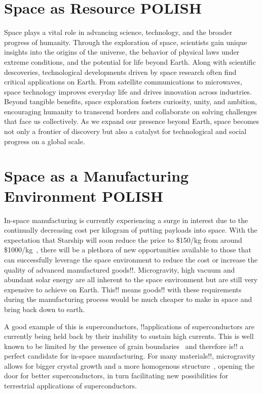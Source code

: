 \section{Space as Resource POLISH}
Space plays a vital role in advancing science, technology, and the broader progress of humanity. Through the exploration of space, scientists gain unique insights into the origins of the universe, the behavior of physical laws under extreme conditions, and the potential for life beyond Earth. Along with scientific descoveries, technological developments driven by space research often find critical applications on Earth. From satellite communications to microwaves, space technology improves everyday life and drives innovation across industries. Beyond tangible benefits, space exploration fosters curiosity, unity, and ambition, encouraging humanity to transcend borders and collaborate on solving challenges that face us collectively. As we expand our presence beyond Earth, space becomes not only a frontier of discovery but also a catalyst for technological and social progress on a global scale.

\section{Space as a Manufacturing Environment POLISH}
In-space manufacturing is currently experiencing a surge in interest due to the continually decreasing cost per kilogram of putting payloads into space. With the expectation that Starship will soon reduce the price to \$150/kg from around \$1000/kg~\cite{nextbigfuture2024spacex}, there will be a plethora of new opportunities available to those that can successfully leverage the space environment to reduce the cost or increase the quality of advanced manufactured goods!!. Microgravity, high vacuum and abundant solar energy are all inherent to the space environment but are still very expensive to achieve on Earth. This!! means goods!! with these requirements during the manufacturing process would be much cheaper to make in space and bring back down to earth.

A good example of this is superconductors, !!applications of superconductors are currently being held back by their inability to sustain high currents. This is well known to be limited by the presence of grain boundaries~\cite{hilgenkamp2002grain} and therefore is!! a perfect candidate for in-space manufacturing. For many materials!!, microgravity allows for bigger crystal growth and a more homogenous structure~\cite{issnll_mccg}, opening the door for better superconductors, in turn facilitating new possibilities for terrestrial applications of superconductors.

